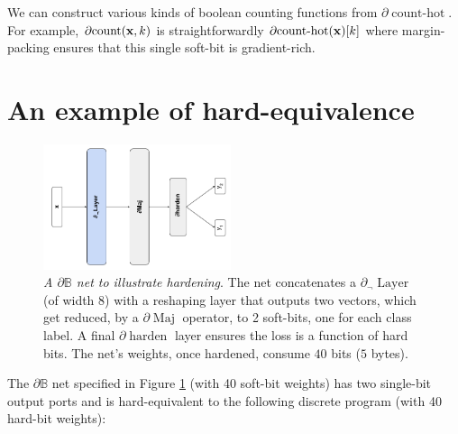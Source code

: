 \documentclass{article}
\theoremstyle{plain}
\theoremstyle{definition}
\theoremstyle{remark}
\begin{document}
We can construct various kinds of boolean counting functions from $\partial\!\operatorname{count-hot}$. For example, $\partial\!\operatorname{count}({\bf x}, k)$ is straightforwardly $\partial\!\operatorname{count-hot}({\bf x})[k]$ where margin-packing ensures that this single soft-bit is gradient-rich.

\section{An example of hard-equivalence}\label{sec:discrete}

\begin{figure}[h!]
	\centering
	\includegraphics[width=0.49\textwidth]{../toy-example-architecture.png}
	\caption{{\em A $\partial\mathbb{B}$ net to illustrate hardening}. The net concatenates a $\partial_{\neg}\!\operatorname{Layer}$ (of width 8) with a reshaping layer that outputs two vectors, which get reduced, by a $\partial\!\operatorname{Maj}$ operator,  to 2 soft-bits, one for each class label. A final $\partial\!\operatorname{harden}$ layer ensures the loss is a function of hard bits. The net's weights, once hardened, consume $40$ bits ($5$ bytes).}
	\label{fig:toy-example-architecture}
\end{figure}

The $\partial\mathbb{B}$ net specified in Figure \ref{fig:toy-example-architecture} (with 40 soft-bit weights) has two single-bit output ports and is hard-equivalent to the following discrete program (with 40 hard-bit weights):
\end{document}
